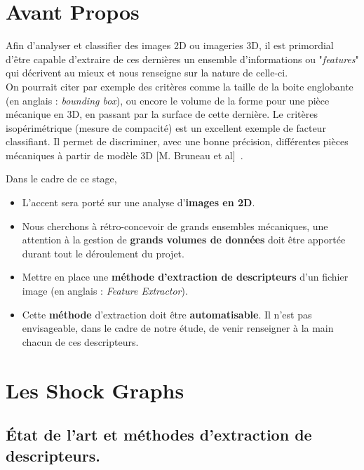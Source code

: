 \section*{Avant Propos}

Afin d'analyser et classifier des images 2D ou imageries 3D, il est primordial d'être capable d'extraire de ces dernières un ensemble d'informations ou "\textit{features}" qui décrivent au mieux et nous renseigne sur la nature de celle-ci.\\
On pourrait citer par exemple des critères comme la taille de la boite englobante (en anglais : \textit{bounding box}), ou encore le volume de la forme pour une pièce mécanique en 3D, en passant par la surface de cette dernière. Le critères isopérimétrique (mesure de compacité) est un excellent exemple de facteur classifiant. Il permet de discriminer, avec une bonne précision, différentes pièces mécaniques à partir de modèle 3D [M. Bruneau et al]~\cite{Bruneau2014}.

Dans le cadre de ce stage,\\
\begin{itemize}
	\item	L'accent sera porté sur une analyse d'\textbf{images en 2D}.\\
	\item	Nous cherchons à rétro-concevoir de grands ensembles mécaniques, une attention à la gestion de \textbf{grands volumes de données} doit être apportée durant tout le déroulement du projet.\\
	\item	Mettre en place une \textbf{méthode d'extraction de descripteurs} d'un fichier image (en anglais : \textit{Feature Extractor}).\\
	\item	Cette \textbf{méthode} d'extraction doit être \textbf{automatisable}. Il n'est pas envisageable, dans le cadre de notre étude, de venir renseigner à la main chacun de ces descripteurs.	
\end{itemize}
\vspace{3mm}
  

\section{Les Shock Graphs}

\subsection{État de l'art et méthodes d'extraction de descripteurs.}

